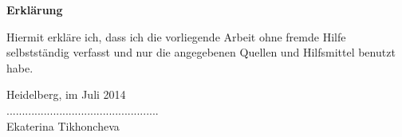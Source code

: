 \begin{center}
\Large{\textsf{\textbf{Erklärung}}}
\end{center}
\vspace{0.8cm}
Hiermit erkläre ich, dass ich die vorliegende Arbeit ohne fremde Hilfe selbstständig
verfasst und nur die angegebenen Quellen und Hilfsmittel benutzt habe.

Heidelberg, im Juli 2014
\\[1cm]
.................................................\\[0.2cm]
Ekaterina Tikhoncheva